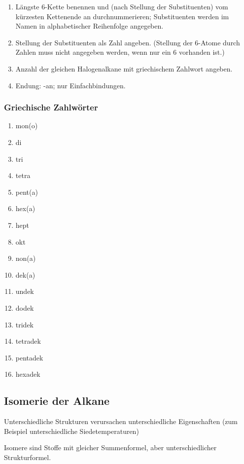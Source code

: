 \begin{enumerate}
	\item Längste \ac{6}-Kette benennen und (nach Stellung der Substituenten)
		vom kürzesten Kettenende an durchnummerieren; Substituenten werden im
		Namen in alphabetischer Reihenfolge angegeben.
	\item Stellung der Substituenten als Zahl angeben.
		(Stellung der \ac{6}-Atome durch Zahlen muss nicht angegeben werden,
		wenn nur ein \ac{6} vorhanden ist.)
	\item Anzahl der gleichen Halogenalkane mit griechischem Zahlwort angeben.
	\item Endung: -an; %
		nur Einfachbindungen.
\end{enumerate}

\subsubsection{Griechische Zahlwörter}
\begin{multicols}{4}
\begin{enumerate}
	\item mon(o)
	\item di
	\item tri
	\item tetra
	\item pent(a)
	\item hex(a)
	\item hept
	\item okt
	\item non(a)
	\item dek(a)
	\item undek
	\item dodek
	\item tridek
	\item tetradek
	\item pentadek
	\item hexadek
\end{enumerate}
\end{multicols}

\subsection{Isomerie der Alkane}
Unterschiedliche Strukturen verursachen unterschiedliche Eigenschaften
(zum Beispiel unterschiedliche Siedetemperaturen)

Isomere sind Stoffe mit gleicher Summenformel, aber unterschiedlicher Strukturformel.

